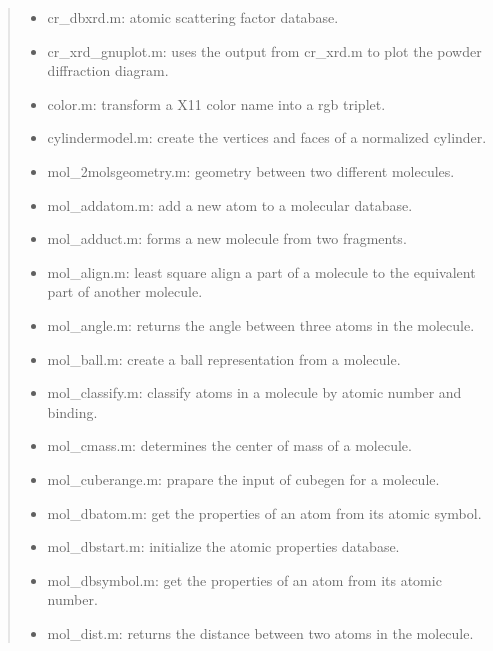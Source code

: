 \documentclass[a4paper]{article}
\begin{document}
\begin{quote}
\begin{itemize}
\item cr\_dbxrd.m: atomic scattering factor database.

\item cr\_xrd\_gnuplot.m: uses the output from cr\_xrd.m to plot the
powder diffraction diagram.

\item color.m: transform a X11 color name into a rgb triplet.

\item cylindermodel.m: create the vertices and faces of a normalized cylinder.

\item mol\_2molsgeometry.m: geometry between two different molecules.

\item mol\_addatom.m: add a new atom to a molecular database.

\item mol\_adduct.m: forms a new molecule from two fragments.

\item mol\_align.m: least square align a part of a molecule to the equivalent
part of another molecule.

\item mol\_angle.m: returns the angle between three atoms in the molecule.

\item mol\_ball.m: create a ball representation from a molecule.

\item mol\_classify.m: classify atoms in a molecule by atomic number and binding.

\item mol\_cmass.m: determines the center of mass of a molecule.

\item mol\_cuberange.m: prapare the input of cubegen for a molecule.

\item mol\_dbatom.m: get the properties of an atom from its atomic symbol.

\item mol\_dbstart.m: initialize the atomic properties database.

\item mol\_dbsymbol.m: get the properties of an atom from its atomic number.

\item mol\_dist.m: returns the distance between two atoms in the molecule.


\end{itemize}
\end{quote}
\end{document}
